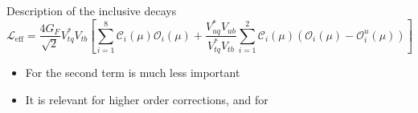 \documentclass[xcolor=dvipsnames]{beamer}
\begin{document}
\begin{frame}{Description of the inclusive \BtoXsgamma decays}
   \scriptsize
      \begin{equation}\nonumber
         \mathcal{L}_{\mathrm{eff}} = \frac{4G_F}{\sqrt{2}}V_{tq}^*V_{tb}\left[\sum^{8}_{i=1}\mathcal{C}_i(\mu)\mathcal{O}_i(\mu)
                                                     + \frac{V^*_{uq}V_{ub}}{V^*_{tq}V_{tb}}\sum^{2}_{i=1}\mathcal{C}_i(\mu)(\mathcal{O}_i(\mu)-\mathcal{O}_i^u(\mu))\right]
      \end{equation}
   
   \begin{itemize}
      \item For \btosgamma the second term is much less important
      \item It is relevant for higher order corrections, and for \btodgamma
   \end{itemize}
  
\end{frame}
\end{document}

